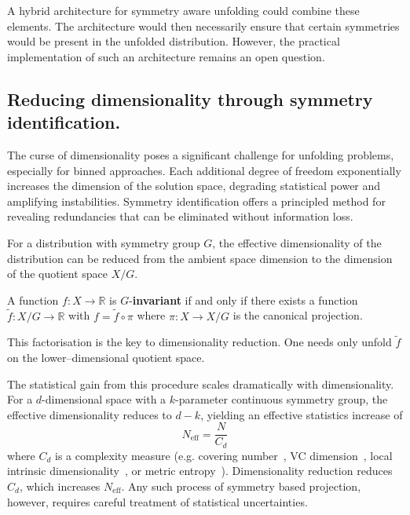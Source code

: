         A hybrid architecture for symmetry aware unfolding could combine these elements.
        The architecture would then necessarily ensure that certain symmetries would be present in the unfolded distribution.
        However, the practical implementation of such an architecture remains an open question.
    \subsection{Reducing dimensionality through symmetry identification.}
        The curse of dimensionality poses a significant challenge for unfolding problems, especially for binned approaches.
        Each additional degree of freedom exponentially increases the dimension of the solution space, degrading statistical power and amplifying instabilities.
        Symmetry identification offers a principled method for revealing redundancies that can be eliminated without information loss.
        
        For a distribution with symmetry group \(G\), the effective dimensionality of the distribution can be reduced from the ambient space dimension to the dimension of the quotient space \(X/G\).

        \begin{definition}
        A function \(f: X \rightarrow \mathbb{R}\) is \(G\)-\textbf{invariant} if and only if there exists a function \(\tilde{f}: X/G \rightarrow \mathbb{R}\) with \(f = \tilde{f} \circ \pi\) where \(\pi: X \rightarrow X/G\) is the canonical projection.
        \end{definition}
        
        This factorisation is the key to dimensionality reduction.
        One needs only unfold \(\tilde{f}\) on the lower--dimensional quotient space.
        
        The statistical gain from this procedure scales dramatically with dimensionality.
        For a \(d\)-dimensional space with a \(k\)-parameter continuous symmetry group, the effective dimensionality reduces to \(d-k\), yielding an effective statistics increase of
        \[
            N_{\text{eff}} = \frac{N}{C_d}
        \]
        where \(C_d\) is a complexity measure (e.g. covering number~\cite{shalev-shwartz_understanding_2014}, VC dimension~\cite{vapnik_uniform_1971}, local intrinsic dimensionality~\cite{tempczyk_lidl_2022}, or metric entropy~\cite{20166.1Uses}).
        Dimensionality reduction reduces \(C_d\), which increases \(N_{\text{eff}}\).
        Any such process of symmetry based projection, however, requires careful treatment of statistical uncertainties.
        
